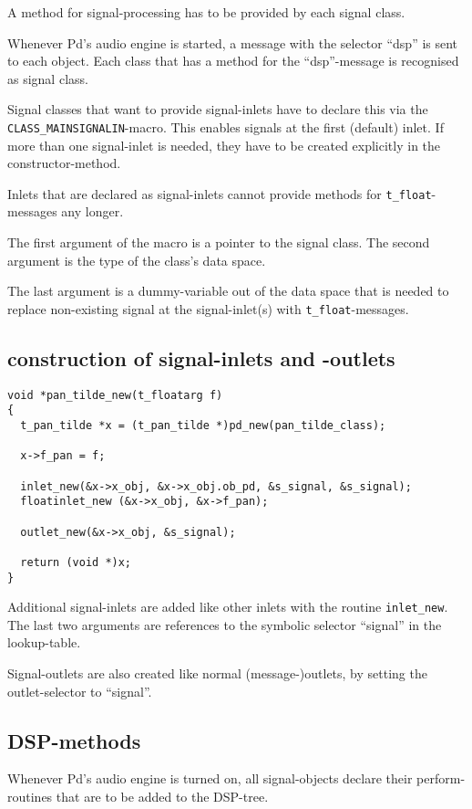 \documentclass[12pt, a4paper,english,titlepage]{article}
\begin{document}
A method for signal-processing has to be provided by each signal class.

Whenever Pd's audio engine is started, a message with the selector ``dsp''
is sent to each object.
Each class that has a method for the ``dsp''-message is recognised as signal class.

Signal classes that want to provide signal-inlets have to
declare this via the \verb+CLASS_MAINSIGNALIN+-macro.
This enables signals at the first (default) inlet.
If more than one signal-inlet is needed, they have to be created explicitly
in the constructor-method.

Inlets that are declared as signal-inlets cannot provide
methods for \verb+t_float+-messages any longer.

The first argument of the macro is a pointer to the signal class.
The second argument is the type of the class's data space.

The last argument is a dummy-variable out of the data space that is needed
to replace non-existing signal at the signal-inlet(s) with \verb+t_float+-messages.

\subsection{construction of signal-inlets and -outlets}

\begin{verbatim}
void *pan_tilde_new(t_floatarg f)
{
  t_pan_tilde *x = (t_pan_tilde *)pd_new(pan_tilde_class);

  x->f_pan = f;
  
  inlet_new(&x->x_obj, &x->x_obj.ob_pd, &s_signal, &s_signal);
  floatinlet_new (&x->x_obj, &x->f_pan);

  outlet_new(&x->x_obj, &s_signal);

  return (void *)x;
}
\end{verbatim}

Additional signal-inlets are added like other inlets with the routine \verb+inlet_new+.
The last two arguments are references to the symbolic selector ``signal''
in the lookup-table.

Signal-outlets are also created like normal (message-)outlets,
by setting the outlet-selector to ``signal''.

\subsection{DSP-methods}
Whenever Pd's audio engine is turned on,
all signal-objects declare their perform-routines that are to be added to the DSP-tree.
\end{document}

